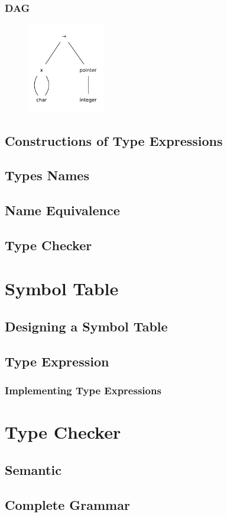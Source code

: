 \subsubsection{DAG}
\begin{figure}[H]
    \centerline{\includegraphics[width=0.3\textwidth]{img/37.pdf}}
\end{figure}

\subsection{Constructions of Type Expressions}

\subsection{Types Names}

\subsection{Name Equivalence}

\subsection{Type Checker}


\section{Symbol Table}

\subsection{Designing a Symbol Table}

\subsection{Type Expression}

\subsubsection{Implementing Type Expressions}

\section{Type Checker}
\subsection{Semantic}

\subsection{Complete Grammar}

